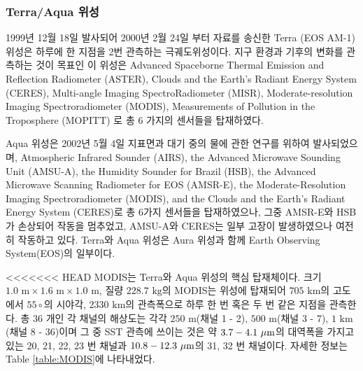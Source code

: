 \subsubsection{Terra/Aqua 위성}

1999년 12월 18일 발사되어 2000년 2월 24일 부터 자료를 송신한 Terra (EOS AM-1) 위성은 하루에 한 지점을 2번 관측하는 극궤도위성이다. 지구 환경과 기후의 변화를 관측하는 것이 목표인 이 위성은 Advanced Spaceborne Thermal Emission and Reflection Radiometer (ASTER), Clouds and the Earth's Radiant Energy System (CERES), Multi-angle Imaging SpectroRadiometer (MISR), Moderate-resolution Imaging Spectroradiometer (MODIS),  Measurements of Pollution in the Troposphere (MOPITT) 로 총 6 가지의 센서들을 탑재하였다. 

Aqua 위성은 2002년 5월 4일 지표면과 대기 중의 물에 관한 연구를 위하여 발사되었으며, Atmospheric Infrared Sounder (AIRS), the Advanced Microwave Sounding Unit (AMSU-A), the Humidity Sounder for Brazil (HSB), the Advanced Microwave Scanning Radiometer for EOS (AMSR-E), the Moderate-Resolution Imaging Spectroradiometer (MODIS), and the Clouds and the Earth's Radiant Energy System (CERES)로 총 6가지 센서들을 탑재하였으나, 그중 AMSR-E와 HSB가 손상되어 작동을 멈추었고, AMSU-A와 CERES는 일부 고장이 발생하였으나 여전히 작동하고 있다. Terra와 Aqua 위성은 Aura 위성과 함께 Earth Observing System(EOS)의 일부이다. 

<<<<<<< HEAD
MODIS는 Terra와 Aqua 위성의 핵심 탑재체이다. 크기 $1.0\textrm{ m} \times 1.6 \textrm{ m} \times 1.0 \textrm{ m}$, 질량 $228.7 \textrm{ kg}$의 MODIS는 위성에 탑재되어 $705 \textrm{ km}$의 고도에서 $55 \circ$의 시야각, $2330 \textrm{ km}$의 관측폭으로 하루 한 번 혹은 두 번 같은 지점을 관측한다. 총 36 개인 각 채널의 해상도는 각각 $250 \textrm{ m}$(채널 1 - 2), $500 \textrm{ m}$(채널 3 - 7), $1 \textrm{ km}$(채널 8 - 36)이며 그 중 SST 관측에 쓰이는 것은 약 $3.7 - 4.1 \textrm{ }\rm{\mu m}$의 대역폭을 가지고 있는 20, 21, 22, 23 번 채널과 $10.8 - 12.3 \textrm{ }\rm{\mu m}$의 31, 32 번 채널이다. 자세한 정보는 Table \ref{table:MODIS}에 나타내었다.


